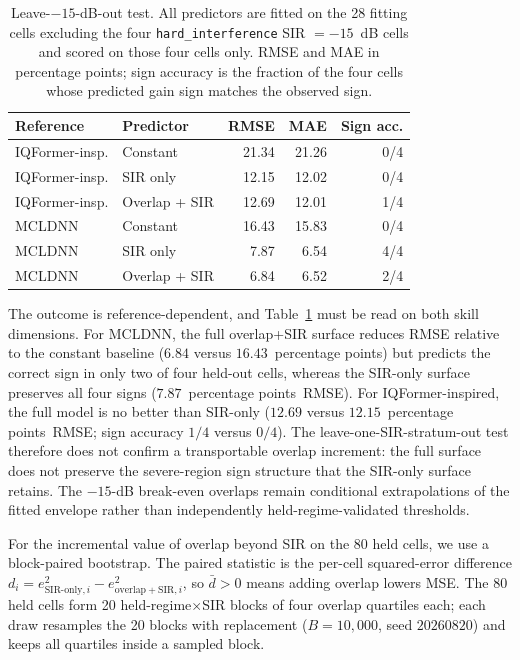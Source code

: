 \documentclass[letterpaper,onecolumn,11pt,journal]{IEEEtran}
\newcommand{\pp}{percentage points}
\begin{document}
\begin{table}[t]
\centering
\caption{Leave-$-15$-dB-out test. All predictors are fitted on the 28
fitting cells excluding the four \texttt{hard\_interference} SIR $=-15$~dB
cells and scored on those four cells only. RMSE and MAE in \pp; sign
accuracy is the fraction of the four cells whose predicted gain sign matches
the observed sign.}
\label{tab:leave15}
\footnotesize
\setlength{\tabcolsep}{4pt}
\begin{tabular}{llrrr}
\toprule
Reference & Predictor & RMSE & MAE & Sign acc.\\
\midrule
IQFormer-insp. & Constant & 21.34 & 21.26 & 0/4\\
IQFormer-insp. & SIR only & 12.15 & 12.02 & 0/4\\
IQFormer-insp. & Overlap + SIR & 12.69 & 12.01 & 1/4\\
\midrule
MCLDNN & Constant & 16.43 & 15.83 & 0/4\\
MCLDNN & SIR only & 7.87 & 6.54 & 4/4\\
MCLDNN & Overlap + SIR & 6.84 & 6.52 & 2/4\\
\bottomrule
\end{tabular}
\end{table}

The outcome is reference-dependent, and Table~\ref{tab:leave15} must be read
on both skill dimensions. For MCLDNN, the full overlap+SIR surface reduces
RMSE relative to the constant baseline ($6.84$ versus $16.43$~\pp) but
predicts the correct sign in only two of four held-out cells, whereas the
SIR-only surface preserves all four signs ($7.87$~\pp\ RMSE). For
IQFormer-inspired, the full model is no better than SIR-only ($12.69$ versus
$12.15$~\pp\ RMSE; sign accuracy $1/4$ versus $0/4$). The
leave-one-SIR-stratum-out test therefore does not confirm a transportable
overlap increment: the full surface does not preserve the severe-region sign
structure that the SIR-only surface retains. The $-15$-dB break-even overlaps
remain conditional extrapolations of the fitted envelope rather than
independently held-regime-validated thresholds.

For the incremental value of overlap beyond SIR on the 80 held cells, we use
a block-paired bootstrap. The paired statistic is the per-cell
squared-error difference
$d_i=e^2_{\mathrm{SIR\text{-}only},i}-e^2_{\mathrm{overlap+SIR},i}$, so
$\bar d>0$ means adding overlap lowers MSE. The 80 held cells form 20
held-regime$\times$SIR blocks of four overlap quartiles each; each draw
resamples the 20 blocks with replacement ($B=10{,}000$, seed $20260820$)
and keeps all quartiles inside a sampled block.
\end{document}
